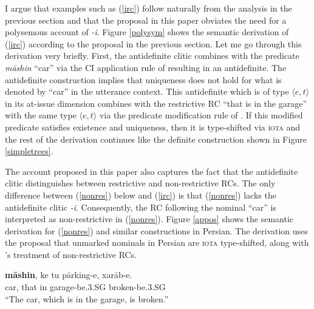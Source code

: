 \documentclass{salt}
\begin{document}
I argue that examples such as (\ref{irc}) follow naturally from the analysis in the previous section and that the proposal in this paper obviates the need for a polysemous account of \emph{-i}. Figure \ref{polysym} shows the semantic derivation of (\ref{irc}) according to the proposal in the previous section. Let me go through this derivation very briefly. First, the antidefinite clitic combines with the predicate \emph{m\={a}shin} ``car'' via the CI application rule of \cite{potts2005logic} resulting in an antidefinite. The antidefinite construction implies that uniqueness does not hold for what is denoted by ``car'' in the utterance context. This antidefinite which is of type $\langle e, t\rangle$ in its at-issue dimension combines with the restrictive RC ``that is in the garage'' with the same type $\langle e, t\rangle$ via the predicate modification rule of \cite{heim1998semantics}. If this modified predicate satisfies existence and uniqueness, then it is type-shifted via \textsc{iota} and the rest of the derivation continues like the definite construction shown in Figure \ref{simpletrees}.

The account proposed in this paper also captures the fact that the antidefinite clitic distinguishes between restrictive and non-restrictive RCs. The only difference between (\ref{nonres}) below and (\ref{irc}) is that (\ref{nonres}) lacks the antidefinite clitic \emph{-i}. Consequently, the RC following the nominal ``car'' is interpreted as non-restrictive in (\ref{nonres}). Figure \ref{appos} shows the semantic derivation for (\ref{nonres}) and similar constructions in Persian. The derivation uses the proposal that unmarked nominals in Persian are \textsc{iota} type-shifted, along with \cite{potts2005logic}'s treatment of non-restrictive RCs.

	\begin {exe}
	\ex \label {nonres}
		\gll	\textbf{m\={a}shin},	ke tu p\={a}rking-e,	xar\={a}b-e.\\
			car, that in garage-be{\scriptsize .3.SG} 	broken-be{\scriptsize .3.SG}\\
			``The car, which is in the garage, is broken.''
	\end {exe}
\end{document}
